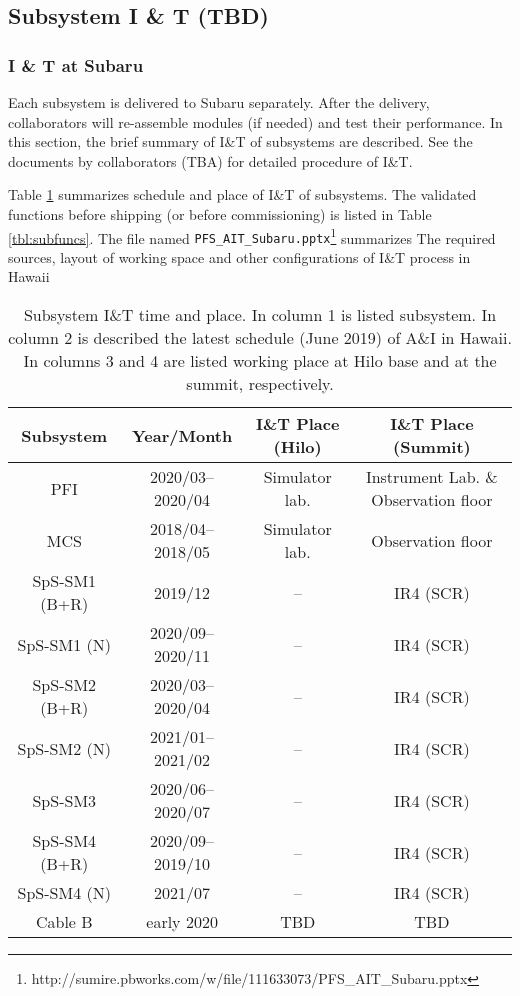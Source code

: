 \subsection{Subsystem I \& T (TBD)}
\subsubsection{I \& T at Subaru}
Each subsystem is delivered to Subaru separately.
After the delivery, collaborators will re-assemble modules (if needed) and test their performance.
In this section, the brief summary of I\&T of subsystems are described.
See the documents by collaborators (TBA) for detailed procedure of I\&T.

Table \ref{tbl:SubSysIandT} summarizes schedule and place of I\&T of subsystems.
The validated functions before shipping (or before commissioning) is listed in Table \ref{tbl:subfuncs}.
The file named {\tt PFS\_AIT\_Subaru.pptx}\footnote{http://sumire.pbworks.com/w/file/111633073/PFS\_AIT\_Subaru.pptx} summarizes The required sources, layout of working space and other configurations of I\&T process in Hawaii

\begin{table}[!ht]
\begin{center}
\caption{Subsystem I\&T time and place.
In column 1 is listed subsystem.
In column 2 is described the latest schedule (June 2019) of A\&I in Hawaii.
In columns 3 and 4 are listed working place at Hilo base and at the summit, respectively.
}
\label{tbl:SubSysIandT} 
\begin{tabular}{*{4}{c}} \hline
Subsystem	& Year/Month & I\&T Place (Hilo) & I\&T Place (Summit) \\ \hline \hline
PFI	& 2020/03--2020/04		& Simulator lab.	& Instrument Lab. \& Observation floor \\
MCS	& 2018/04--2018/05	& Simulator lab.	& Observation floor \\
SpS-SM1 (B+R)	& 2019/12		& -- 	& IR4 (SCR) \\
SpS-SM1 (N)	& 2020/09--2020/11		& -- 	& IR4 (SCR) \\
SpS-SM2 (B+R)	& 2020/03--2020/04		& --	 	& IR4 (SCR) \\
SpS-SM2 (N)	& 2021/01--2021/02		& -- 	& IR4 (SCR) \\
SpS-SM3	& 2020/06--2020/07		& -- 	& IR4 (SCR) \\
SpS-SM4 (B+R)	&  2020/09--2019/10		& -- 	& IR4 (SCR) \\
SpS-SM4 (N)	& 2021/07		& -- 	& IR4 (SCR) \\
Cable B	&	early 2020	& TBD	&TBD \\ \hline
\end{tabular} 
\end{center}
\end{table}

